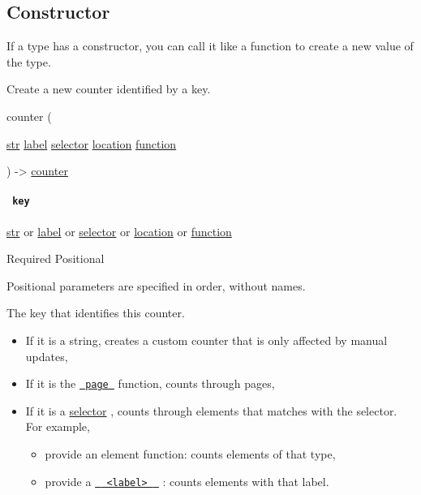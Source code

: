 \subsection{\texorpdfstring{Constructor
{}}{Constructor }}\label{constructor}

\label{constructor-constructor-tooltip}
If a type has a constructor, you can call it like a function to create a
new value of the type.

Create a new counter identified by a key.

{ counter } (

{ \href{/docs/reference/foundations/str/}{str}
\href{/docs/reference/foundations/label/}{label}
\href{/docs/reference/foundations/selector/}{selector}
\href{/docs/reference/introspection/location/}{location}
\href{/docs/reference/foundations/function/}{function} }

) -\textgreater{} \href{/docs/reference/introspection/counter/}{counter}

\paragraph{\texorpdfstring{\texttt{\ key\ }}{ key }}\label{constructor-key}

\href{/docs/reference/foundations/str/}{str} {or}
\href{/docs/reference/foundations/label/}{label} {or}
\href{/docs/reference/foundations/selector/}{selector} {or}
\href{/docs/reference/introspection/location/}{location} {or}
\href{/docs/reference/foundations/function/}{function}

{Required} {{ Positional }}

\label{constructor-key-positional-tooltip}
Positional parameters are specified in order, without names.

The key that identifies this counter.

\begin{itemize}
\tightlist
\item
  If it is a string, creates a custom counter that is only affected by
  manual updates,
\item
  If it is the \href{/docs/reference/layout/page/}{\texttt{\ page\ }}
  function, counts through pages,
\item
  If it is a \href{/docs/reference/foundations/selector/}{selector} ,
  counts through elements that matches with the selector. For example,

  \begin{itemize}
  \tightlist
  \item
    provide an element function: counts elements of that type,
  \item
    provide a
    \href{/docs/reference/foundations/label/}{\texttt{\ }{\texttt{\ \textless{}label\textgreater{}\ }}\texttt{\ }}
    : counts elements with that label.
  \end{itemize}
\end{itemize}

